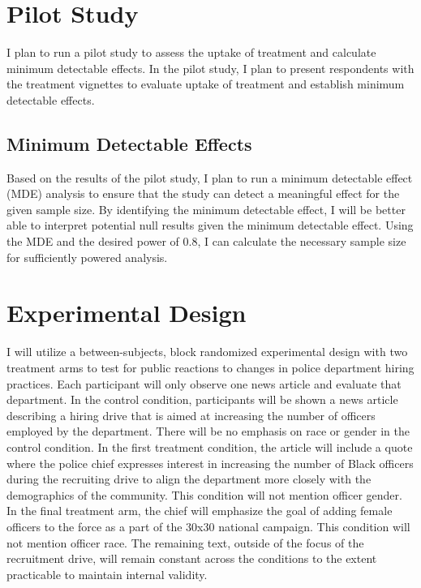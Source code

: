\documentclass[12pt]{article}
\begin{document}
\section{Pilot Study}

I plan to run a pilot study to assess the uptake of treatment and calculate minimum detectable effects. In the pilot study, I plan to present respondents with the treatment vignettes to evaluate uptake of treatment and establish minimum detectable effects.

\subsection{Minimum Detectable Effects}

Based on the results of the pilot study, I plan to run a minimum detectable effect (MDE) analysis to ensure that the study can detect a meaningful effect for the given sample size. By identifying the minimum detectable effect, I will be better able to interpret potential null results given the minimum detectable effect. Using the MDE and the desired power of 0.8, I can calculate the necessary sample size for sufficiently powered analysis.


\section{Experimental Design}

I will utilize a between-subjects, block randomized experimental design with two treatment arms to test for public reactions to changes in police department hiring practices. Each participant will only observe one news article and evaluate that department. In the control condition, participants will be shown a news article describing a hiring drive that is aimed at increasing the number of officers employed by the department. There will be no emphasis on race or gender in the control condition. In the first treatment condition, the article will include a quote where the police chief expresses interest in increasing the number of Black officers during the recruiting drive to align the department more closely with the demographics of the community. This condition will not mention officer gender. In the final treatment arm, the chief will emphasize the goal of adding female officers to the force as a part of the 30x30 national campaign. This condition will not mention officer race. The remaining text, outside of the focus of the recruitment drive, will remain constant across the conditions to the extent practicable to maintain internal validity.
\end{document}
